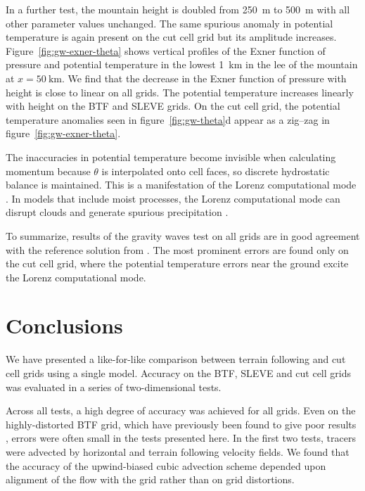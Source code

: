 \documentclass{ametsoc}
\begin{document}
In a further test, the mountain height is doubled from \SI{250}{\meter} to \SI{500}{\meter} with all other parameter values unchanged.  The same spurious anomaly in potential temperature is again present on the cut cell grid but its amplitude increases.  Figure~\ref{fig:gw-exner-theta} shows vertical profiles of the Exner function of pressure and potential temperature in the lowest \SI{1}{\kilo\meter} in the lee of the mountain at \(x = \SI{50}{\kilo\meter}\).  We find that the decrease in the Exner function of pressure with height is close to linear on all grids.  The potential temperature increases linearly with height on the BTF and SLEVE grids.  On the cut cell grid, the potential temperature anomalies seen in figure~\ref{fig:gw-theta}d appear as a zig--zag in figure~\ref{fig:gw-exner-theta}.

The inaccuracies in potential temperature become invisible when calculating momentum because $\theta$ is interpolated onto cell faces, so discrete hydrostatic balance is maintained.  This is a manifestation of the Lorenz computational mode \citep{arakawa-konor1996,holdaway2013b}.  In models that include moist processes, the Lorenz computational mode can disrupt clouds and generate spurious precipitation \citep{hollingsworth1995}.

To summarize, results of the gravity waves test on all grids are in good agreement with the reference solution from \citet{melvin2010}.  The most prominent errors are found only on the cut cell grid, where the potential temperature errors near the ground excite the Lorenz computational mode.


\section{Conclusions}
We have presented a like-for-like comparison between terrain following and cut cell grids using a single model.  Accuracy on the BTF, SLEVE and cut cell grids was evaluated in a series of two-dimensional tests.

Across all tests, a high degree of accuracy was achieved for all grids.  Even on the highly-distorted BTF grid, which have previously been found to give poor results \citep{schaer2002,klemp2011,good2014}, errors were often small in the tests presented here.  In the first two tests, tracers were advected by horizontal and terrain following velocity fields.  We found that the accuracy of the upwind-biased cubic advection scheme depended upon alignment of the flow with the grid rather than on grid distortions.
\end{document}
